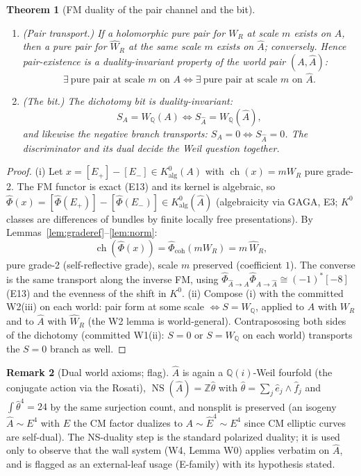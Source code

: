 \documentclass[11pt]{article}
\newtheorem{theorem}{Theorem}[section]
\theoremstyle{definition}
\newtheorem{remark}[theorem]{Remark}
\newcommand{\ch}{\operatorname{ch}}
\newcommand{\NS}{\operatorname{NS}}
\newcommand{\Q}{\mathbb{Q}}
\newcommand{\Z}{\mathbb{Z}}
\newcommand{\FMc}{\widehat\Phi}
\begin{document}
\begin{theorem}[FM duality of the pair channel and the bit]\label{thm:w5}
\mbox{}
\begin{enumerate}
\item[(i)] (Pair transport.) If a holomorphic pure pair for $W_R$ at scale
$m$ exists on $A$, then a pure pair for $\widehat W_R$ at the \emph{same}
scale $m$ exists on $\widehat A$; conversely. Hence pair-existence is a
duality-invariant property of the world pair $(A,\widehat A)$:
\[
\exists\ \text{pure pair at scale } m \text{ on } A
\iff
\exists\ \text{pure pair at scale } m \text{ on } \widehat A.
\]
\item[(ii)] (The bit.) The dichotomy bit is duality-invariant:
\[
S_A=W_\Q(A)\iff S_{\widehat A}=W_\Q(\widehat A),
\]
and likewise the negative branch transports: $S_A=0\iff S_{\widehat A}=0$.
The discriminator and its dual decide the Weil question \emph{together}.
\end{enumerate}
\end{theorem}

\begin{proof}
(i) Let $x=[E_+]-[E_-]\in K^0_{\mathrm{alg}}(A)$ with $\ch(x)=mW_R$ pure
grade-2. The FM functor is exact (E13) and its kernel is algebraic, so
$\FMc(x)=[\FMc(E_+)]-[\FMc(E_-)]\in K^0_{\mathrm{alg}}(\widehat A)$
(algebraicity via GAGA, E3; $K^0$ classes are differences of bundles by
finite locally free presentations). By
Lemmas~\ref{lem:graderef}--\ref{lem:norm}:
\[
\ch(\FMc(x))=\FMc_{\mathrm{coh}}(mW_R)=m\,\widehat W_R,
\]
pure grade-2 (self-reflective grade), scale $m$ preserved (coefficient $1$).
The converse is the same transport along the inverse FM, using
$\FMc_{\widehat A\to A}\FMc_{A\to\widehat A}\cong(-1)^*[-8]$ (E13) and the
evenness of the shift in $K^0$.
(ii) Compose (i) with the committed W2(iii) on each world: pair form at some
scale $\iff S=W_\Q$, applied to $A$ with $W_R$ and to $\widehat A$ with
$\widehat W_R$ (the W2 lemma is world-general). Contrapososing both sides of
the dichotomy (committed W1(ii): $S=0$ or $S=W_\Q$ on each world) transports
the $S=0$ branch as well.
\end{proof}

\begin{remark}[Dual world axioms; flag]
$\widehat A$ is again a $\Q(i)$-Weil fourfold (the conjugate action via the
Rosati), $\NS(\widehat A)=\Z\widehat\theta$ with
$\widehat\theta=\sum_j\hat e_j\wedge\hat f_j$ and
$\int\widehat\theta^4=24$ by the same surjection count, and nonsplit is
preserved (an isogeny $\widehat A\sim E^4$ with $E$ the CM factor dualizes
to $A\sim\widehat E^4\sim E^4$ since CM elliptic curves are self-dual).
The NS-duality step is the standard polarized duality; it is used only to
observe that the wall system (W4, Lemma W0) applies verbatim on
$\widehat A$, and is flagged as an external-leaf usage (E-family) with its
hypothesis stated.
\end{remark}
\end{document}
